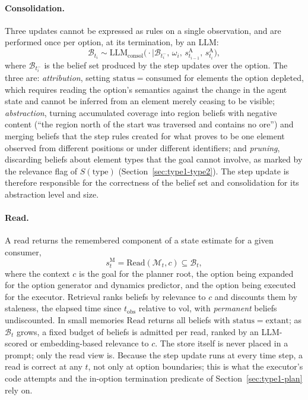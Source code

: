 \documentclass[11pt]{article}
\newcommand{\llm}[1]{\mathrm{LLM}_{\mathrm{#1}}}
\newcommand{\calM}{\mathcal{M}}
\newcommand{\calB}{\mathcal{B}}
\newcommand{\sA}{s^{\mathrm{A}}}
\newcommand{\sM}{s^{\mathrm{M}}}
\newcommand{\Read}{\mathrm{Read}}
\newcommand{\vol}{\mathrm{vol}}
\newcommand{\stat}{\mathrm{status}}
\newcommand{\type}{\mathrm{type}}
\newcommand{\tobs}{t_{\mathrm{obs}}}
\begin{document}
\paragraph{Consolidation.}
Three updates cannot be expressed as rules on a single observation, and are performed once per option, at its termination, by an LLM:
\begin{equation}
\calB_{t_i}\sim\llm{consol}\big(\cdot\mid\calB_{t_i^-},\,\omega_i,\,\sA_{t_{i-1}},\,\sA_{t_i}\big),
\label{eq:consol}
\end{equation}
where $\calB_{t_i^-}$ is the belief set produced by the step updates over the option. The three are: \emph{attribution}, setting $\stat=\mathrm{consumed}$ for elements the option depleted, which requires reading the option's semantics against the change in the agent state and cannot be inferred from an element merely ceasing to be visible; \emph{abstraction}, turning accumulated coverage into region beliefs with negative content (``the region north of the start was traversed and contains no ore'') and merging beliefs that the step rules created for what proves to be one element observed from different positions or under different identifiers; and \emph{pruning}, discarding beliefs about element types that the goal cannot involve, as marked by the relevance flag of $S(\type)$ (Section~\ref{sec:type1-type2}). The step update is therefore responsible for the correctness of the belief set and consolidation for its abstraction level and size.

\paragraph{Read.}
A read returns the remembered component of a state estimate for a given consumer,
\begin{equation}
\sM_t=\Read(\calM_t,c)\subseteq\calB_t,
\label{eq:read}
\end{equation}
where the context $c$ is the goal for the planner root, the option being expanded for the option generator and dynamics predictor, and the option being executed for the executor. Retrieval ranks beliefs by relevance to $c$ and discounts them by staleness, the elapsed time since $\tobs$ relative to $\vol$, with \emph{permanent} beliefs undiscounted. In small memories $\Read$ returns all beliefs with $\stat=\mathrm{extant}$; as $\calB_t$ grows, a fixed budget of beliefs is admitted per read, ranked by an LLM-scored or embedding-based relevance to $c$. The store itself is never placed in a prompt; only the read view is. Because the step update runs at every time step, a read is correct at any $t$, not only at option boundaries; this is what the executor's code attempts and the in-option termination predicate of Section~\ref{sec:type1-plan} rely on.
\end{document}
